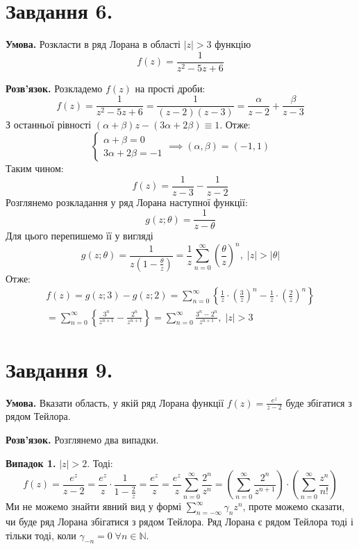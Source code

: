 \documentclass[14pt]{extarticle}
\begin{document}
\section*{Завдання 6.}

\textbf{Умова.} Розкласти в ряд Лорана в області $|z|>3$ функцію 
\[f(z) = \frac{1}{z^2-5z+6}\]

\textbf{Розв'язок.} Розкладемо $f(z)$ на прості дроби:
\[
f(z) = \frac{1}{z^2-5z+6} = \frac{1}{(z-2)(z-3)} = \frac{\alpha}{z-2} + \frac{\beta}{z-3}
\]
З останньої рівності $(\alpha+\beta)z - (3\alpha+2\beta)\equiv 1$. Отже:
\[
\begin{cases}
    \alpha+\beta = 0 \\
    3\alpha+2\beta = -1
\end{cases} \implies (\alpha,\beta) = (-1,1)
\]
Таким чином:
\[
f(z) = \frac{1}{z-3} - \frac{1}{z-2}
\]
Розглянемо розкладання у ряд Лорана наступної функції:
\[
g(z;\theta)=\frac{1}{z-\theta}
\]
Для цього перепишемо її у вигляді
\[
g(z;\theta) = \frac{1}{z(1-\frac{\theta}{z})} = \frac{1}{z}\sum_{n=0}^{\infty} \left(\frac{\theta}{z}\right)^n, \; |z| > |\theta|
\]
Отже:
\begin{gather*}
f(z) = g(z;3) - g(z;2) = \sum_{n=0}^{\infty} \left\{ \frac{1}{z} \cdot \left(\frac{3}{z}\right)^n - \frac{1}{z} \cdot \left(\frac{2}{z}\right)^n \right\} \\
= \sum_{n=0}^{\infty} \left\{ \frac{3^n}{z^{n+1}} - \frac{2^n}{z^{n+1}} \right\} = \boxed{\sum_{n=0}^{\infty} \frac{3^n-2^n}{z^{n+1}}, \; |z| > 3}
\end{gather*}

\section*{Завдання 9.}

\textbf{Умова.} Вказати область, у якій ряд Лорана функції $f(z) = \frac{e^z}{z-2}$ буде збігатися з рядом Тейлора.

\textbf{Розв'язок.} Розглянемо два випадки.

\textbf{Випадок 1.} $|z|>2$. Тоді:
\[
f(z) = \frac{e^z}{z-2} = \frac{e^z}{z} \cdot \frac{1}{1-\frac{2}{z}} = \frac{e^z}{z} = \frac{e^z}{z}\sum_{n=0}^{\infty} \frac{2^n}{z^n} = \left(\sum_{n=0}^{\infty} \frac{2^n}{z^{n+1}}\right) \cdot \left(\sum_{n=0}^{\infty} \frac{z^n}{n!}\right)
\]
Ми не можемо знайти явний вид у формі $\sum_{n=-\infty}^{\infty}\gamma_nz^n$, проте можемо сказати, чи буде ряд Лорана збігатися з рядом Тейлора. Ряд Лорана є рядом Тейлора тоді і тільки тоді, коли $\gamma_{-n}=0 \; \forall n \in \mathbb{N}$. 
\end{document}
